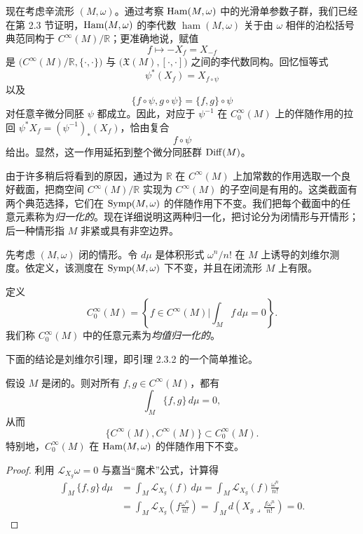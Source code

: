 现在考虑辛流形 $(M,\omega)$。通过考察 $\operatorname{Ham}(M,\omega)$ 中的光滑单参数子群，我们已经在第 2.3 节证明，$\operatorname{Ham}(M,\omega)$ 的李代数
$\operatorname{ham}(M,\omega)$ 关于由 $\omega$ 相伴的泊松括号典范同构于
$C^\infty(M)/\mathbb R$；更准确地说，赋值
\[
 f\longmapsto-X_f=X_{-f}
\]
是 $\bigl(C^\infty(M)/\mathbb R,\{\mathord\cdot,\mathord\cdot\}\bigr)$ 与
$\bigl(\mathfrak X(M),[\mathord\cdot,\mathord\cdot]\bigr)$ 之间的李代数同构。回忆恒等式
\[
 \psi^*(X_f)=X_{f\circ\psi}
\]
以及
\[
 \{f\circ\psi,g\circ\psi\}=\{f,g\}\circ\psi
\]
对任意辛微分同胚 $\psi$ 都成立。因此，对应于 $\psi^{-1}$ 在
$C_0^\infty(M)$ 上的伴随作用的拉回
$\psi^*X_f=(\psi^{-1})_*(X_f)$，恰由复合
\[
 f\circ\psi
\]
给出。显然，这一作用延拓到整个微分同胚群 $\operatorname{Diff}(M)$。

由于许多稍后将看到的原因，通过为 $\mathbb R$ 在 $C^\infty(M)$ 上加常数的作用选取一个良好截面，把商空间 $C^\infty(M)/\mathbb R$ 实现为
$C^\infty(M)$ 的子空间是有用的。这类截面有两个典范选择，它们在
$\operatorname{Symp}(M,\omega)$ 的伴随作用下不变。我们把每个截面中的任意元素称为\emph{归一化的}。现在详细说明这两种归一化，把讨论分为闭情形与开情形；后一种情形指 $M$ 非紧或具有非空边界。

先考虑 $(M,\omega)$ 闭的情形。令 $d\mu$ 是体积形式
$\omega^n/n!$ 在 $M$ 上诱导的刘维尔测度。依定义，该测度在
$\operatorname{Symp}(M,\omega)$ 下不变，并且在闭流形 $M$ 上有限。

\begin{definition}\label{def:mean-normalized-functions}
定义
\[
 C_0^\infty(M)
 =\left\{f\in C^\infty(M)\mathrel{\bigg|}
   \int_M f\,d\mu=0\right\}.
\]
我们称 $C_0^\infty(M)$ 中的任意元素为\emph{均值归一化的}。
\end{definition}

下面的结论是刘维尔引理，即引理 2.3.2 的一个简单推论。

\begin{lemma}\label{lem:poisson-bracket-zero-mean}
假设 $M$ 是闭的。则对所有 $f,g\in C^\infty(M)$，都有
\[
 \int_M\{f,g\}\,d\mu=0,
\]
从而
\[
 \{C^\infty(M),C^\infty(M)\}\subset C_0^\infty(M).
\]
特别地，$C_0^\infty(M)$ 在 $\operatorname{Ham}(M,\omega)$ 的伴随作用下不变。
\end{lemma}

\begin{proof}
利用 $\mathcal L_{X_g}\omega=0$ 与嘉当“魔术”公式，计算得
\[
\begin{aligned}
 \int_M\{f,g\}\,d\mu
 &=\int_M\mathcal L_{X_g}(f)\,d\mu
  =\int_M\mathcal L_{X_g}(f)\frac{\omega^n}{n!}\\
 &=\int_M\mathcal L_{X_g}\left(f\frac{\omega^n}{n!}\right)
  =\int_M d\left(X_g\mathbin{\lrcorner}
      \frac{f\omega^n}{n!}\right)=0.
\end{aligned}
\]
\end{proof}

